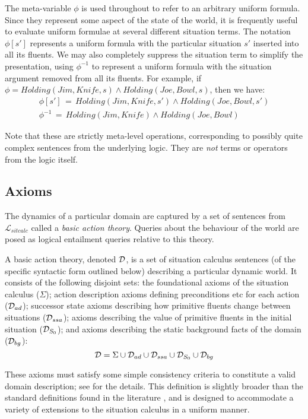 The meta-variable $\phi$ is used throughout to refer to an arbitrary
uniform formula. Since they represent some aspect of the state of
the world, it is frequently useful to evaluate uniform formulae at
several different situation terms. The notation $\phi[s']$ represents
a uniform formula with the particular situation $s'$ inserted into
all its fluents. We may also completely suppress the situation term
to simplify the presentation, using $\phi^{-1}$ to represent a uniform
formula with the situation argument removed from all its fluents.
For example, if $\phi=Holding(Jim,Knife,s)\wedge Holding(Joe,Bowl,s)$,
then we have:\begin{gather*}
\phi[s']\,=\, Holding(Jim,Knife,s')\wedge Holding(Joe,Bowl,s')\\
\phi^{-1}\,=\, Holding(Jim,Knife)\wedge Holding(Joe,Bowl)\end{gather*}


Note that these are strictly meta-level operations, corresponding
to possibly quite complex sentences from the underlying logic. They
are \emph{not} terms or operators from the logic itself.


\subsection{Axioms\label{sec:Background:SC:Axioms}}

The dynamics of a particular domain are captured by a set of sentences
from $\mathcal{L}_{sitcalc}$ called a \emph{basic action theory}.
Queries about the behaviour of the world are posed as logical entailment
queries relative to this theory.

\begin{defnL}
 A basic action theory, denoted
$\mathcal{D}$, is a set of situation calculus sentences (of the specific
syntactic form outlined below) describing a particular dynamic world.
It consists of the following disjoint sets: the foundational axioms
of the situation calculus ($\Sigma$); action description axioms defining
preconditions etc for each action ($\mathcal{D}_{ad}$); successor state axioms
describing how primitive fluents change between situations ($\mathcal{D}_{ssa}$);
axioms describing the value of primitive fluents in the initial situation
($\mathcal{D}_{S_{0}}$); and axioms describing the static background facts
of the domain ($\mathcal{D}_{bg}$):\[
\mathcal{D}=\Sigma\cup\mathcal{D}_{ad}\cup\mathcal{D}_{ssa}\cup\mathcal{D}_{S_{0}}\cup\mathcal{D}_{bg}\]

\end{defnL}
These axioms must satisfy some simple consistency criteria to constitute
a valid domain description; see \citep{pirri99contributions_sitcalc}
for the details. This definition is slightly broader than the standard
definitions found in the literature \citep{levesque98sc_foundations,pirri99contributions_sitcalc,reiter01kia},
and is designed to accommodate a variety of extensions to the situation
calculus in a uniform manner.

